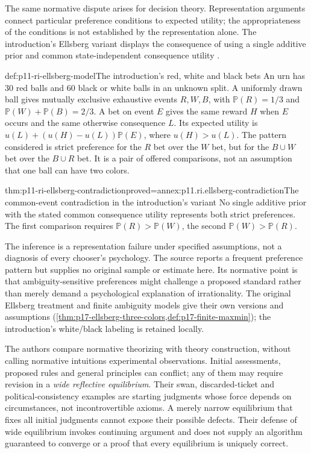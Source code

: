 The same normative dispute arises for decision theory. Representation
arguments connect particular preference conditions to expected utility;
the appropriateness of the conditions is not established by the
representation alone. The introduction's Ellsberg variant displays
the consequence of using a single additive prior and common
state-independent consequence utility
\cite[pp.~19--20]{KnauffSpohn2021FrameworksIntro}.

\begin{hbdefinition}{def:p11-ri-ellsberg-model}{The introduction's red, white and black bets}
An urn has 30 red balls and 60 black or white balls in an unknown
split. A uniformly drawn ball gives mutually exclusive exhaustive
events \(R,W,B\), with \(\mathbb P(R)=1/3\) and
\(\mathbb P(W)+\mathbb P(B)=2/3\). A bet on event \(E\)
gives the same reward \(H\) when \(E\) occurs and the same
otherwise consequence \(L\). Its expected utility is
\(u(L)+(u(H)-u(L))\mathbb P(E)\), where \(u(H)>u(L)\).
The pattern considered is strict preference for the \(R\) bet over
the \(W\) bet, but for the \(B\cup W\) bet over the
\(B\cup R\) bet. It is a pair of offered comparisons, not an
assumption that one ball can have two colors.
\end{hbdefinition}

\begin{hbtheorem}{thm:p11-ri-ellsberg-contradiction}{proved=annex:p11.ri.ellsberg-contradiction}{The common-event contradiction in the introduction's variant}
No single additive prior with the stated common consequence utility
represents both strict preferences. The first comparison requires
\(\mathbb P(R)>\mathbb P(W)\), the second
\(\mathbb P(W)>\mathbb P(R)\).
\end{hbtheorem}

The inference is a representation failure under specified assumptions,
not a diagnosis of every chooser's psychology. The source reports a
frequent preference pattern but supplies no original sample or estimate
here. Its normative point is that ambiguity-sensitive preferences might
challenge a proposed standard rather than merely demand a psychological
explanation of irrationality. The original Ellsberg treatment and
finite ambiguity models give their own versions and assumptions
(\cref{thm:p17-ellsberg-three-colors,def:p17-finite-maxmin});
the introduction's white/black labeling is retained locally.

The authors compare normative theorizing with theory construction,
without calling normative intuitions experimental observations. Initial
assessments, proposed rules and general principles can conflict; any
of them may require revision in a \emph{wide reflective equilibrium}.
Their swan, discarded-ticket and political-consistency examples are
starting judgments whose force depends on circumstances, not
incontrovertible axioms. A merely narrow equilibrium that fixes all
initial judgments cannot expose their possible defects. Their defense
of wide equilibrium invokes continuing argument and does not supply
an algorithm guaranteed to converge or a proof that every equilibrium
is uniquely correct.

